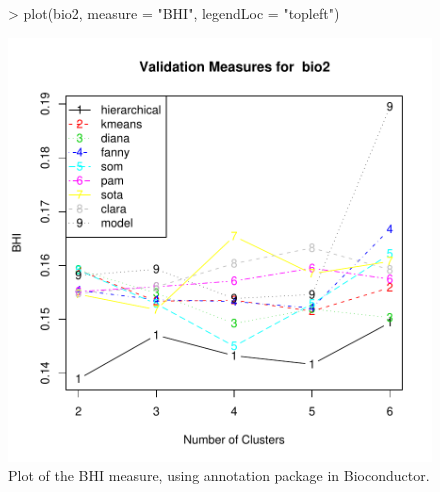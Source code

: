 \documentclass[11pt]{article}
\begin{document}
\begin{figure}
  \centering
\begin{Schunk}
\begin{Sinput}
> plot(bio2, measure = "BHI", legendLoc = "topleft")
\end{Sinput}
\end{Schunk}
\includegraphics{clValid-021}
  \caption{Plot of the BHI measure, using annotation package
     in Bioconductor.}
  \label{fig:BHI2}
\end{figure}
\end{document}
